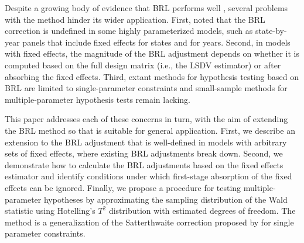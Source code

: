 \documentclass[12pt]{article}\usepackage[]{graphicx}\usepackage[]{color}
\begin{document}
Despite a growing body of evidence that BRL performs well \citep[e.g.,][]{Imbens2015robust}, several problems with the method hinder its wider application. 
First, \citet{Angrist2009mostly} noted that the BRL correction is undefined in some highly parameterized models, such as state-by-year panels that include fixed effects for states and for years.
Second, in models with fixed effects, the magnitude of the BRL adjustment depends on whether it is computed based on the full design matrix (i.e., the LSDV estimator) or after absorbing the fixed effects.%
Third, extant methods for hypothesis testing based on BRL are limited to single-parameter constraints \citep{Bell2002bias, McCaffrey2006improved} and small-sample methods for multiple-parameter hypothesis tests remain lacking.

This paper addresses each of these concerns in turn, with the aim of extending the BRL method so that is suitable for general application. 
First, we describe an extension to the BRL adjustment that is well-defined in models with arbitrary sets of fixed effects, where existing BRL adjustments break down. 
Second, we demonstrate how to calculate the BRL adjustments based on the fixed effects estimator and identify conditions under which first-stage absorption of the fixed effects can be ignored.
Finally, we propose a procedure for testing multiple-parameter hypotheses by approximating the sampling distribution of the Wald statistic using Hotelling's $T^2$ distribution with estimated degrees of freedom. The method is a generalization of the Satterthwaite correction proposed by \citet{Bell2002bias} for single parameter constraints.
\end{document}
